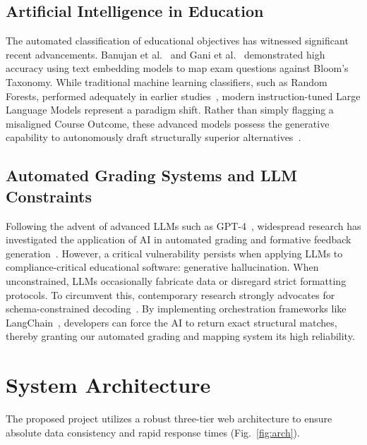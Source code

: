 \documentclass[conference]{IEEEtran}
\begin{document}
\subsection{Artificial Intelligence in Education}
The automated classification of educational objectives has witnessed significant recent advancements. Banujan et al.~\cite{banujan2023} and Gani et al.~\cite{gani2022} demonstrated high accuracy using text embedding models to map exam questions against Bloom's Taxonomy. While traditional machine learning classifiers, such as Random Forests, performed adequately in earlier studies~\cite{kumar2022}, modern instruction-tuned Large Language Models represent a paradigm shift. Rather than simply flagging a misaligned Course Outcome, these advanced models possess the generative capability to autonomously draft structurally superior alternatives~\cite{almatrafi2025}.

\subsection{Automated Grading Systems and LLM Constraints}
Following the advent of advanced LLMs such as GPT-4~\cite{openai2023}, widespread research has investigated the application of AI in automated grading and formative feedback generation~\cite{kasneci2023, mdpi2024}. However, a critical vulnerability persists when applying LLMs to compliance-critical educational software: generative hallucination. When unconstrained, LLMs occasionally fabricate data or disregard strict formatting protocols. To circumvent this, contemporary research strongly advocates for schema-constrained decoding~\cite{arxiv2024structured}. By implementing orchestration frameworks like LangChain~\cite{langchain2022, intechopen2024}, developers can force the AI to return exact structural matches, thereby granting our automated grading and mapping system its high reliability.

\section{System Architecture}

The proposed project utilizes a robust three-tier web architecture to ensure absolute data consistency and rapid response times (Fig.~\ref{fig:arch}).
\end{document}

